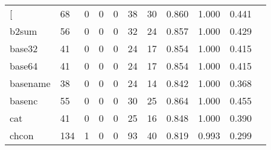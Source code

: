 \begin{longtable}{lp{1.10cm}p{1.10cm}p{1.10cm}p{1.10cm}p{1.10cm}p{1.10cm}p{1.10cm}p{1.10cm}p{1.10cm}p{1.10cm}}
\bottomrule
\endlastfoot
{[}         &                     68 &                                  0 &                                 0 &                                0 &                                38 &                              30 &                          0.860 &                                 1.000 &                               0.441 \\
b2sum     &                     56 &                                  0 &                                 0 &                                0 &                                32 &                              24 &                          0.857 &                                 1.000 &                               0.429 \\
base32    &                     41 &                                  0 &                                 0 &                                0 &                                24 &                              17 &                          0.854 &                                 1.000 &                               0.415 \\
base64    &                     41 &                                  0 &                                 0 &                                0 &                                24 &                              17 &                          0.854 &                                 1.000 &                               0.415 \\
basename  &                     38 &                                  0 &                                 0 &                                0 &                                24 &                              14 &                          0.842 &                                 1.000 &                               0.368 \\
basenc    &                     55 &                                  0 &                                 0 &                                0 &                                30 &                              25 &                          0.864 &                                 1.000 &                               0.455 \\
cat       &                     41 &                                  0 &                                 0 &                                0 &                                25 &                              16 &                          0.848 &                                 1.000 &                               0.390 \\
chcon     &                    134 &                                  1 &                                 0 &                                0 &                                93 &                              40 &                          0.819 &                                 0.993 &                               0.299 \\

\end{longtable}
